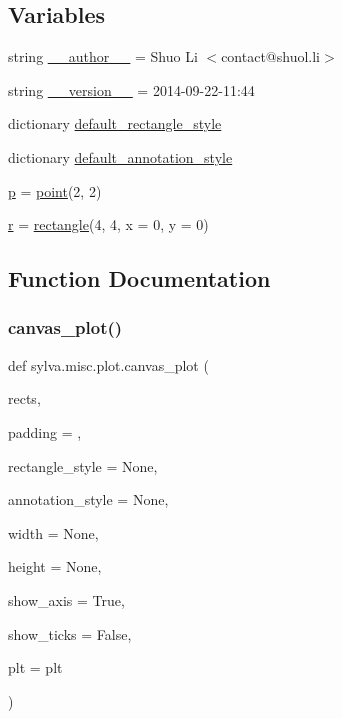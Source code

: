 \subsection*{Variables}
\begin{DoxyCompactItemize}
\item 
string \hyperlink{namespacesylva_1_1misc_1_1plot_a7500c696078a3d942b466b4627141020}{\+\_\+\+\_\+author\+\_\+\+\_\+} = \textquotesingle{}Shuo Li $<$contact@shuol.\+li$>$\textquotesingle{}
\item 
string \hyperlink{namespacesylva_1_1misc_1_1plot_aeaebaa88de4546f2ce3ff8b7e568797e}{\+\_\+\+\_\+version\+\_\+\+\_\+} = \textquotesingle{}2014-\/09-\/22-\/11\+:44\textquotesingle{}
\item 
dictionary \hyperlink{namespacesylva_1_1misc_1_1plot_a9d341463b25190ccc0193e07c697648f}{default\+\_\+rectangle\+\_\+style}
\item 
dictionary \hyperlink{namespacesylva_1_1misc_1_1plot_affc8bfc885cfaf5e1995cf4fd8d084c6}{default\+\_\+annotation\+\_\+style}
\item 
\hyperlink{namespacesylva_1_1misc_1_1plot_a0cda7def12ec7fe347a18675bc3f3ead}{p} = \hyperlink{classsylva_1_1misc_1_1plot_1_1point}{point}(2, 2)
\item 
\hyperlink{namespacesylva_1_1misc_1_1plot_a620aa90142604ebb167426bcbd31acb1}{r} = \hyperlink{classsylva_1_1misc_1_1plot_1_1rectangle}{rectangle}(4, 4, x = 0, y = 0)
\end{DoxyCompactItemize}


\subsection{Function Documentation}
\mbox{\label{namespacesylva_1_1misc_1_1plot_a405ea3f626f2fbeea085e412f742ce68}} 
\subsubsection{\texorpdfstring{canvas\+\_\+plot()}{canvas\_plot()}}
{\footnotesize\ttfamily def sylva.\+misc.\+plot.\+canvas\+\_\+plot (\begin{DoxyParamCaption}\item[{}]{rects,  }\item[{}]{padding = {},  }\item[{}]{rectangle\+\_\+style = {\ttfamily None},  }\item[{}]{annotation\+\_\+style = {\ttfamily None},  }\item[{}]{width = {\ttfamily None},  }\item[{}]{height = {\ttfamily None},  }\item[{}]{show\+\_\+axis = {\ttfamily True},  }\item[{}]{show\+\_\+ticks = {\ttfamily False},  }\item[{}]{plt = {\ttfamily plt} }\end{DoxyParamCaption})}



